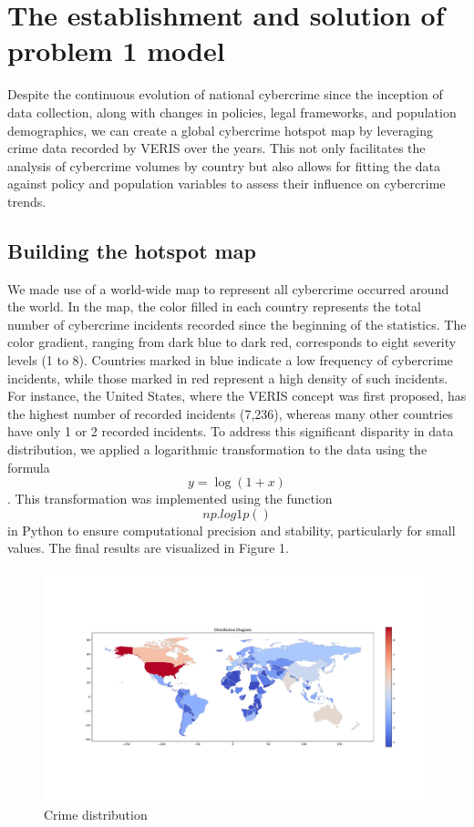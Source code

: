 \documentclass[12pt]{article}
\begin{document}
\section{The establishment and solution of problem 1 model}\label{sec:the-establishment-and-solution-of-problem-1-model} %
	Despite the continuous evolution of national cybercrime since the inception of data collection,
	along with changes in policies, legal frameworks, and population demographics,
	we can create a global cybercrime hotspot map by leveraging crime data recorded by VERIS over the years.
	This not only facilitates the analysis of cybercrime volumes by country
	but also allows for fitting the data against policy and population variables to assess their influence on cybercrime trends.
	\subsection{Building the hotspot map}\label{subsec:Building-the-hotspot-map} %
		We made use of a world-wide map to represent all cybercrime occurred around the world.
		In the map, the color filled in each country represents the total number of cybercrime incidents recorded since the beginning of the statistics.
		The color gradient, ranging from dark blue to dark red, corresponds to eight severity levels (1 to 8).
		Countries marked in blue indicate a low frequency of cybercrime incidents, while those marked in red represent a high density of such incidents.
		For instance, the United States, where the VERIS concept was first proposed, has the highest number of recorded incidents (7,236),
		whereas many other countries have only 1 or 2 recorded incidents.
		To address this significant disparity in data distribution, we applied a logarithmic transformation to the data using the formula
		\[ y=\log(1+x) \].
		This transformation was implemented using the function
		\[ np.log1p() \]
		in Python to ensure computational precision and stability, particularly for small values.
		The final results are visualized in Figure 1.
		\begin{figure}[htbp]
			\centering
			\includegraphics[width=1\textwidth]{./rsrc/Crime_distribution}
			\caption{Crime distribution}
			\label{fig:Crime-distribution}
		\end{figure}
\end{document}
